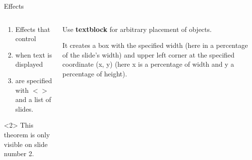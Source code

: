 \documentclass[11pt, aspectratio=169]{beamer}
\begin{document}
\begin{frame}{Effects}
    \begin{columns}[onlytextwidth]
        \begin{column}{0.49\textwidth}
            \begin{enumerate}[<+-|alert@+>]
                \item
                Effects that control

                \item
                when text is displayed

                \item
                are specified with $<>$ and a list of slides.
            \end{enumerate}

            \begin{theorem}<2>
                This theorem is only visible on slide number 2.
            \end{theorem}
        \end{column}
        \begin{column}{0.49\textwidth}
            Use \textbf<2->{textblock} for arbitrary placement of objects.

            \pause
            \medskip

            It creates a box
            with the specified width (here in a percentage of the slide's width)
            and upper left corner at the specified coordinate (x, y)
            (here x is a percentage of width and y a percentage of height).
        \end{column}
    \end{columns}
\end{frame}
\end{document}
